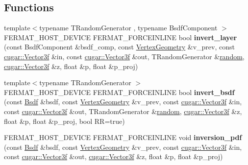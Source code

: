 \subsection*{Functions}
\begin{DoxyCompactItemize}
\item 
\mbox{\label{group___path_module_ga172c19c44ec311215152416c563bf6e2}} 
{\footnotesize template$<$typename T\+Random\+Generator , typename Bsdf\+Component $>$ }\\F\+E\+R\+M\+A\+T\+\_\+\+H\+O\+S\+T\+\_\+\+D\+E\+V\+I\+CE F\+E\+R\+M\+A\+T\+\_\+\+F\+O\+R\+C\+E\+I\+N\+L\+I\+NE bool {\bfseries invert\+\_\+layer} (const Bsdf\+Component \&bsdf\+\_\+comp, const \hyperlink{struct_vertex_geometry}{Vertex\+Geometry} \&v\+\_\+prev, const \hyperlink{structcugar_1_1_vector}{cugar\+::\+Vector3f} \&in, const \hyperlink{structcugar_1_1_vector}{cugar\+::\+Vector3f} \&out, T\+Random\+Generator \&\hyperlink{group___sampling_module_gaec17bbbfd36295353081b7b4480d933d}{random}, \hyperlink{structcugar_1_1_vector}{cugar\+::\+Vector3f} \&z, float \&p, float \&p\+\_\+proj)
\item 
\mbox{\label{group___path_module_ga8ec22d679711a82fbf1d5ef3725605e4}} 
{\footnotesize template$<$typename T\+Random\+Generator $>$ }\\F\+E\+R\+M\+A\+T\+\_\+\+H\+O\+S\+T\+\_\+\+D\+E\+V\+I\+CE F\+E\+R\+M\+A\+T\+\_\+\+F\+O\+R\+C\+E\+I\+N\+L\+I\+NE bool {\bfseries invert\+\_\+bsdf} (const \hyperlink{struct_bsdf}{Bsdf} \&bsdf, const \hyperlink{struct_vertex_geometry}{Vertex\+Geometry} \&v\+\_\+prev, const \hyperlink{structcugar_1_1_vector}{cugar\+::\+Vector3f} \&in, const \hyperlink{structcugar_1_1_vector}{cugar\+::\+Vector3f} \&out, T\+Random\+Generator \&\hyperlink{group___sampling_module_gaec17bbbfd36295353081b7b4480d933d}{random}, \hyperlink{structcugar_1_1_vector}{cugar\+::\+Vector3f} \&z, float \&p, float \&p\+\_\+proj, bool RR=true)
\item 
\mbox{\label{group___path_module_gae6f0e1995f4aba555cbe38d41ef1d44e}} 
F\+E\+R\+M\+A\+T\+\_\+\+H\+O\+S\+T\+\_\+\+D\+E\+V\+I\+CE F\+E\+R\+M\+A\+T\+\_\+\+F\+O\+R\+C\+E\+I\+N\+L\+I\+NE void {\bfseries inversion\+\_\+pdf} (const \hyperlink{struct_bsdf}{Bsdf} \&bsdf, const \hyperlink{struct_vertex_geometry}{Vertex\+Geometry} \&v\+\_\+prev, const \hyperlink{structcugar_1_1_vector}{cugar\+::\+Vector3f} \&in, const \hyperlink{structcugar_1_1_vector}{cugar\+::\+Vector3f} \&out, \hyperlink{structcugar_1_1_vector}{cugar\+::\+Vector3f} \&z, float \&p, float \&p\+\_\+proj)

\end{DoxyCompactItemize}
